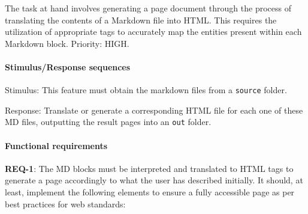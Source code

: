 The task at hand involves generating a page document through the process
of translating the contents of a Markdown file into HTML. This requires
the utilization of appropriate tags to accurately map the entities
present within each Markdown block. Priority: HIGH.

\paragraph{Stimulus/Response
sequences}\label{par:stimulusresponse-sequences}

Stimulus: This feature must obtain the markdown files from a
\texttt{source} folder.

Response: Translate or generate a corresponding HTML file for each one
of these MD files, outputting the result pages into an \texttt{out}
folder.

\paragraph{Functional requirements}\label{par:functional-requirements}

\textbf{REQ-1}: The MD blocks must be interpreted and translated to HTML
tags to generate a page accordingly to what the user has described
initially. It should, at least, implement the following elements to
ensure a fully accessible page as per best practices for web standards\cite{accmoz}:

